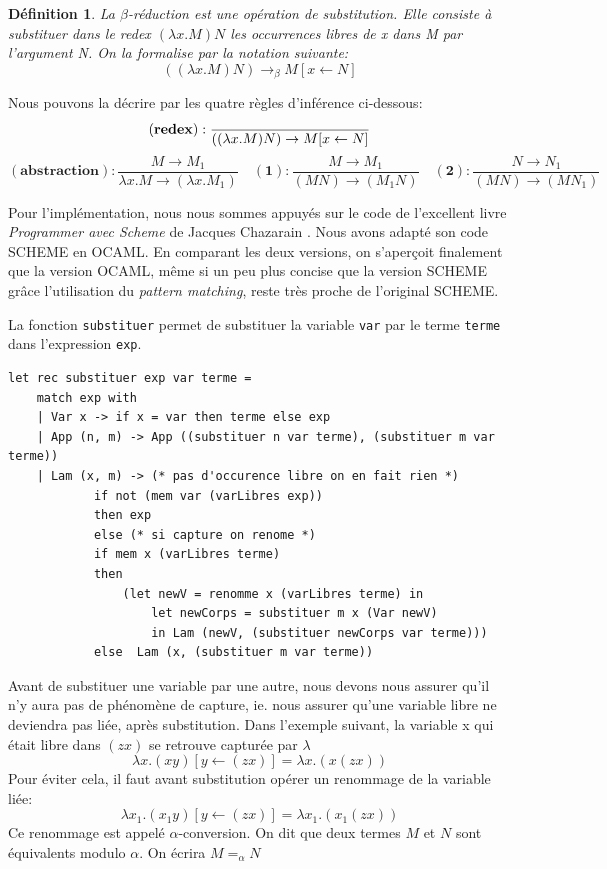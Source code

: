\documentclass[11pt]{book}
\newtheorem{definition}{Définition}
\begin{document}
\begin{definition}
La $\beta $-r\'{e}duction est une op\'{e}ration de substitution. Elle consiste \`{a} substituer dans le redex
$(\lambda x.M) N$ les occurrences libres de x dans M par l'argument N.
On la formalise par la notation suivante:
$$
((\lambda x.M) N) \rightarrow _\beta M[x \leftarrow N]
$$
\end{definition}



Nous pouvons la décrire par les quatre règles d'inférence ci-dessous:
$$
\mathbf{(redex)} : \frac{}{((\lambda x.M)N) \rightarrow M[x \leftarrow N]} \\
$$
$$
\mathbf{(abstraction)} : \frac{M \rightarrow M_1}{ \lambda x.M \rightarrow (\lambda x.M_1)}
\quad \mathbf{(1)} : \frac{M \rightarrow M_1}{(M N) \rightarrow (M_1 N)}
\quad \mathbf{(2)} : \frac{N \rightarrow N_1}{(M N) \rightarrow (M N_1)}
$$

\vspace{0.5cm}
Pour l'implémentation, nous nous sommes appuyés sur le code de l'excellent livre \textit{Programmer avec Scheme} 
de Jacques Chazarain \cite{plisp}.  
Nous avons adapté son code SCHEME en OCAML. En comparant les deux versions, on s'aperçoit finalement
que la version OCAML, même si un peu plus concise que la version SCHEME grâce  l'utilisation du \textit{pattern matching},
reste très proche de l'original SCHEME.

\vspace{0.5cm}
La fonction \texttt{substituer} permet de substituer la variable \texttt{var} par le terme \texttt{terme} dans l'expression \texttt{exp}.

\begin{Verbatim}
let rec substituer exp var terme =
	match exp with
	| Var x -> if x = var then terme else exp
	| App (n, m) -> App ((substituer n var terme), (substituer m var terme))
	| Lam (x, m) -> (* pas d'occurence libre on en fait rien *)
			if not (mem var (varLibres exp))
			then exp
			else (* si capture on renome *)
			if mem x (varLibres terme)
			then
				(let newV = renomme x (varLibres terme) in
					let newCorps = substituer m x (Var newV)
					in Lam (newV, (substituer newCorps var terme)))
			else  Lam (x, (substituer m var terme))
\end{Verbatim}

Avant de substituer une variable par une autre, nous devons nous assurer qu'il n'y aura pas de phénomène de capture, ie.
nous assurer qu'une variable libre ne deviendra pas liée, après substitution.
Dans l'exemple suivant, la variable x qui était libre dans $ (z x) $ se retrouve capturée par $\lambda$
$$ \lambda x. (x y)[y \gets (z x)] = \lambda x.(x (z x)) $$
Pour éviter cela, il faut avant substitution opérer un renommage de la variable liée:
$$ \lambda x_1. (x_1 y)[y \gets (z x)] = \lambda x_1.(x_1 (z x)) $$
Ce renommage est appelé $\alpha$-conversion. On dit que deux termes $M$ et $N$ sont équivalents modulo $\alpha$.
On écrira $M=_\alpha N$
\end{document}
